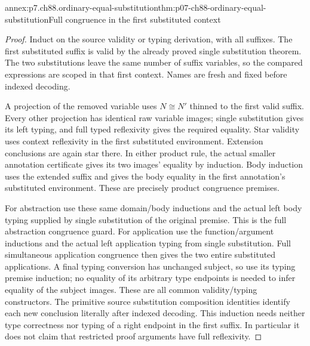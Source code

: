 \begin{annexitem}{annex:p7.ch88.ordinary-equal-substitution}{thm:p07-ch88-ordinary-equal-substitution}{Full congruence in the first substituted context}
\begin{proof}
Induct on the source validity or typing derivation, with all suffixes.
The first substituted suffix is valid by the already proved single
substitution theorem. The two substitutions leave the same number
of suffix variables, so the compared expressions are scoped in that
first context. Names are fresh and fixed before indexed decoding.

A projection of the removed variable uses \(N\cong N'\) thinned
to the first valid suffix. Every other projection has identical raw
variable images; single substitution gives its left typing, and full
typed reflexivity gives the required equality. Star validity uses
context reflexivity in the first substituted environment. Extension
conclusions are again star there. In either product rule, the actual
smaller annotation certificate gives its two images' equality by
induction. Body induction uses the extended suffix and gives the
body equality in the first annotation's substituted environment.
These are precisely product congruence premises.

For abstraction use these same domain/body inductions and the actual
left body typing supplied by single substitution of the original
premise. This is the full abstraction congruence guard. For application
use the function/argument inductions and the actual left application
typing from single substitution. Full simultaneous application
congruence then gives the two entire substituted applications.
A final typing conversion has unchanged subject, so use its typing
premise induction; no equality of its arbitrary type endpoints is
needed to infer equality of the subject images. These are all common
validity/typing constructors. The primitive source substitution
composition identities identify each new conclusion literally after
indexed decoding. This induction needs neither type correctness nor
typing of a right endpoint in the first suffix. In particular it
does not claim that restricted proof arguments have full reflexivity.
\end{proof}
\end{annexitem}


